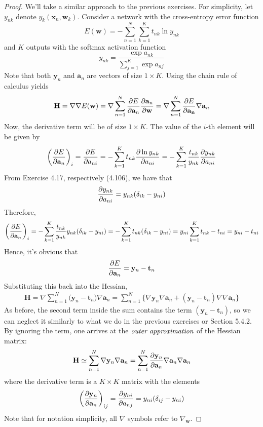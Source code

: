 \vspace{1em}

\begin{proof}
    We'll take a similar approach to the previous exercises. For simplicity,
    let $y_{nk}$ denote $y_{k}(\mathbf{x}_n, \mathbf{w}_k)$. 
    Consider a network with the cross-entropy error function
    \[
        E(\mathbf{w}) = -\sum_{n=1}^{N} \sum_{k=1}^{K} t_{nk} \ln y_{nk}  
    \] 
    and $K$ outputs with the softmax activation function
     \[
         y_{nk} = \frac{\exp{a_{nk}}}{\sum_{j=1}^{K} \exp{a_{nj}}} 
    \] 
    Note that both $\mathbf{y}_n$ and $\mathbf{a}_n$ are vectors 
    of size $1 \times K$. Using the chain rule of calculus yields
    \[
        \mathbf{H} 
        = \nabla \nabla E(\mathbf{w})
        = \nabla \sum_{n=1}^{N} \pdv{E}{\mathbf{a}_n} \pdv{\mathbf{a}_n}{\mathbf{w}}
        = \nabla \sum_{n=1}^{N} \pdv{E}{\mathbf{a_n}} \nabla \mathbf{a}_n 
    \] 
    Now, the derivative term will be of size $1 \times K$. The value of the $i$-th element
    will be given by
    \begin{align*}
        \bigg(\pdv{E}{\mathbf{a}_n}\bigg)_i
        = \pdv{E}{a_{ni}}
        = -\sum_{k=1}^{K} t_{nk} \pdv{\ln y_{nk}}{a_{ni}}
        = -\sum_{k=1}^{K} \frac{t_{nk}}{y_{nk}} \pdv{y_{nk}}{a_{ni}}
    \end{align*}
    From Exercise 4.17, respectively (4.106), we have that
     \[
         \pdv{y_{nk}}{a_{ni}} = y_{nk}(\delta_{ik} - y_{ni})
    \] 
    Therefore,
    \[
        \bigg(\pdv{E}{\mathbf{a}_n}\bigg)_i
        = -\sum_{k=1}^{K} \frac{t_{nk}}{y_{nk}} y_{nk} (\delta_{ik} - y_{ni})
        = -\sum_{k=1}^{K} t_{nk} (\delta_{ik} - y_{ni})
        = y_{ni} \sum_{k=1}^{K} t_{nk} - t_{ni}
        = y_{ni} - t_{ni}
    \] 
    Hence, it's obvious that
    \[
        \pdv{E}{\mathbf{a}_n} = \mathbf{y}_n - \mathbf{t}_n
    \] 
    Substituting this back into the Hessian,
    \begin{align*}
        \mathbf{H} 
        = \nabla \sum_{n=1}^{N} \big(\mathbf{y}_n - \mathbf{t}_n\big) \nabla \mathbf{a}_n
        = \sum_{n=1}^{N} \big\{\nabla \mathbf{y}_n \nabla \mathbf{a}_n 
            + (\mathbf{y}_n - \mathbf{t}_n) \nabla \nabla \mathbf{a}_n\}
    \end{align*}
    As before, the second term inside the sum contains the term $(\mathbf{y}_n - \mathbf{t}_n)$,
    so we can neglect it similarly to what we do in the previous exercises or Section 5.4.2. By ignoring
    the term, one arrives at the $\emph{outer approximation}$ of the Hessian matrix:
    \[
        \mathbf{H} \simeq 
        \sum_{n=1}^{N} \nabla \mathbf{y}_n \nabla \mathbf{a}_n
        = \sum_{n=1}^{N} \pdv{\mathbf{y}_n}{\mathbf{a}_n} \nabla \mathbf{a}_n \nabla \mathbf{a}_n
    \] 
    where the derivative term is a $K \times K$ matrix with the elements
    \[
        \bigg(\pdv{\mathbf{y}_n}{\mathbf{a}_n}\bigg)_{ij}
        = \pdv{y_{ni}}{a_{nj}}
        = y_{ni} (\delta_{ij} - y_{ni})
    \] 
    Note that for notation simplicity, all $\nabla$ symbols refer to $\nabla_\mathbf{w}$.
\end{proof}


